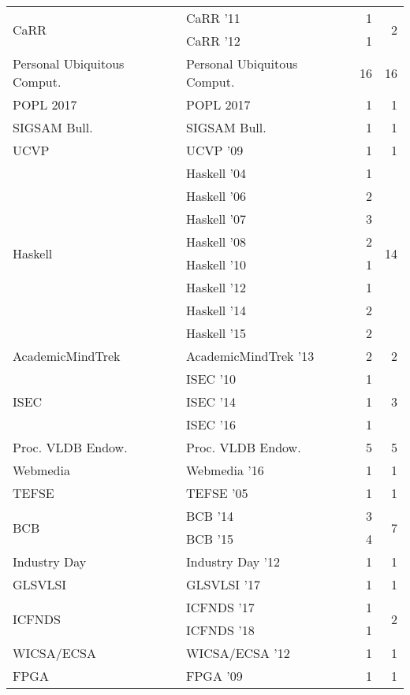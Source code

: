 \begin{table*}[t]
\begin{tabular}{llrr}
\multirow{2}{*}{CaRR } & CaRR '11 & 1 & \multirow{2}{*}{2}\\
& CaRR '12 & 1 &\\
\multirow{1}{*}{Personal Ubiquitous Comput.} & Personal Ubiquitous Comput. & 16 & \multirow{1}{*}{16}\\
\multirow{1}{*}{POPL 2017} & POPL 2017 & 1 & \multirow{1}{*}{1}\\
\multirow{1}{*}{SIGSAM Bull.} & SIGSAM Bull. & 1 & \multirow{1}{*}{1}\\
\multirow{1}{*}{UCVP } & UCVP '09 & 1 & \multirow{1}{*}{1}\\
\multirow{8}{*}{Haskell } & Haskell '04 & 1 & \multirow{8}{*}{14}\\
& Haskell '06 & 2 &\\
& Haskell '07 & 3 &\\
& Haskell '08 & 2 &\\
& Haskell '10 & 1 &\\
& Haskell '12 & 1 &\\
& Haskell '14 & 2 &\\
& Haskell '15 & 2 &\\
\multirow{1}{*}{AcademicMindTrek } & AcademicMindTrek '13 & 2 & \multirow{1}{*}{2}\\
\multirow{3}{*}{ISEC } & ISEC '10 & 1 & \multirow{3}{*}{3}\\
& ISEC '14 & 1 &\\
& ISEC '16 & 1 &\\
\multirow{1}{*}{Proc. VLDB Endow.} & Proc. VLDB Endow. & 5 & \multirow{1}{*}{5}\\
\multirow{1}{*}{Webmedia } & Webmedia '16 & 1 & \multirow{1}{*}{1}\\
\multirow{1}{*}{TEFSE } & TEFSE '05 & 1 & \multirow{1}{*}{1}\\
\multirow{2}{*}{BCB } & BCB '14 & 3 & \multirow{2}{*}{7}\\
& BCB '15 & 4 &\\
\multirow{1}{*}{Industry Day } & Industry Day '12 & 1 & \multirow{1}{*}{1}\\
\multirow{1}{*}{GLSVLSI } & GLSVLSI '17 & 1 & \multirow{1}{*}{1}\\
\multirow{2}{*}{ICFNDS } & ICFNDS '17 & 1 & \multirow{2}{*}{2}\\
& ICFNDS '18 & 1 &\\
\multirow{1}{*}{WICSA/ECSA } & WICSA/ECSA '12 & 1 & \multirow{1}{*}{1}\\
\multirow{1}{*}{FPGA } & FPGA '09 & 1 & \multirow{1}{*}{1}\\

\end{tabular}
\end{table*}
